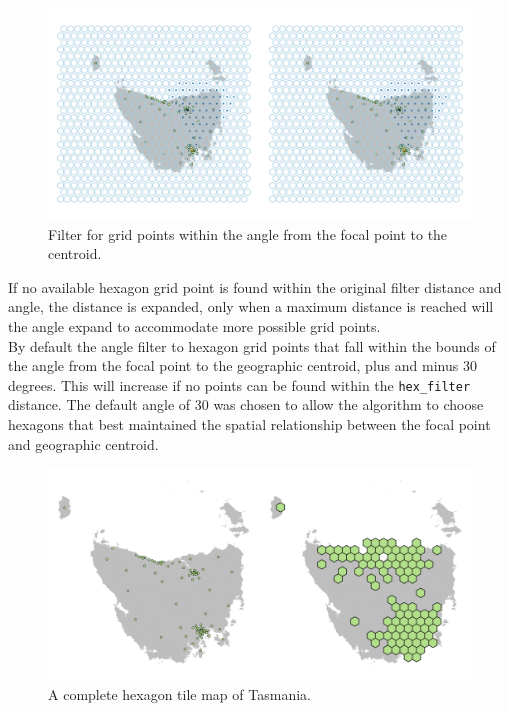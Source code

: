 \documentclass{monashthesis}
\begin{document}
\begin{figure}[H]
\centering
\includegraphics[width=14cm]{figures/03-algorithm/5allocate.png}
\caption{\label{fig:angles}Filter for grid points within the angle from the focal point to the centroid.}
\end{figure}

If no available hexagon grid point is found within the original filter distance and angle, the distance is expanded, only when a maximum distance is reached will the angle expand to accommodate more possible grid points.\\
By default the angle filter to hexagon grid points that fall within the bounds of the angle from the focal point to the geographic centroid, plus and minus 30 degrees. This will increase if no points can be found within the \texttt{hex\_filter} distance. The default angle of 30 was chosen to allow the algorithm to choose hexagons that best maintained the spatial relationship between the focal point and geographic centroid.

\begin{figure}[H]
\centering
\includegraphics[width=14cm]{figures/03-algorithm/6allocate.png}
\caption{\label{fig:buffs}A complete hexagon tile map of Tasmania.}
\end{figure}
\end{document}

